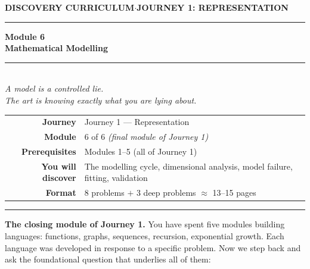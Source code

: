 \documentclass[12pt, a4paper]{article}
\newcounter{problem}
\begin{document}

\thispagestyle{empty}
\begin{center}
{\small\color{MidBlue}\textbf{DISCOVERY CURRICULUM}\quad$\cdot$\quad\textbf{JOURNEY 1: REPRESENTATION}}

\vspace{0.6cm}
{\color{NavyBlue}\rule{\linewidth}{2pt}}
\vspace{0.5cm}

{\Huge\bfseries\color{NavyBlue}Module 6}\\[0.3cm]
{\LARGE\bfseries\color{MidBlue}Mathematical Modelling}\\[0.4cm]
{\color{Gold}\rule{0.4\linewidth}{1.2pt}}\\[0.4cm]
{\large\itshape\color{DarkGrey}
A model is a controlled lie.\\[0.15cm]
The art is knowing exactly what you are lying about.}

\vspace{1cm}
\begin{tabular}{rl}
\color{DarkGrey}\textbf{Journey}           & Journey 1 --- Representation \\[4pt]
\color{DarkGrey}\textbf{Module}            & 6 of 6 \textit{(final module of Journey 1)} \\[4pt]
\color{DarkGrey}\textbf{Prerequisites}     & Modules 1--5 (all of Journey 1) \\[4pt]
\color{DarkGrey}\textbf{You will discover} & The modelling cycle, dimensional analysis, model failure, fitting, validation \\[4pt]
\color{DarkGrey}\textbf{Format}            & 8 problems $+$ 3 deep problems $\approx$ 13--15 pages \\
\end{tabular}

\vspace{1cm}
{\color{NavyBlue}\rule{\linewidth}{2pt}}
\end{center}

\vspace{0.6cm}

\noindent\textbf{The closing module of Journey 1.}
You have spent five modules building languages: functions, graphs, sequences, recursion, exponential growth. Each language was developed in response to a specific problem. Now we step back and ask the foundational question that underlies all of them:
\end{document}
